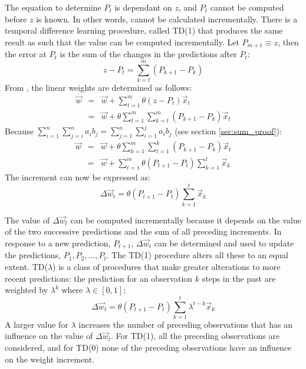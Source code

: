 The equation to determine $P_t$ is dependant on $z$, and $P_t$ cannot be computed before $z$ is known.  In other words,   cannot be calculated incrementally.  There is a temporal difference learning procedure, called TD(1) that produces the same result as   such that the value can be computed incrementally.  Let $P_{m+1}  \equiv z$, then the error at $P_t$ is the sum of the changes in the predictions after $P_t$:
\[
	z - P_t = \sum_{k=t}^{m}(P_{k+1} - P_k)
\]  
From  , the linear weights are determined as follows:
\begin{eqnarray}
\nonumber \vec{w} & = & \vec{w} + \sum_{t=1}^{m}\theta(z - P_t) \vec{x}_t   \\
\nonumber & = & \vec{w} + \theta \sum_{t=1}^{m} \sum_{k=t}^{m}(P_{k+1} - P_k) \vec{x}_t 
\end{eqnarray}
Because $\sum_{i=1}^n\sum_{j=i}^n a_ib_j = \sum_{j=1}^n\sum_{i=1}^j a_ib_j$ (see section \ref{sec:sum_proof}):
\begin{eqnarray}
\nonumber \vec{w} & = & \vec{w} +  \theta \sum_{k=1}^{m}\sum_{t=1}^{k}(P_{k+1} - P_k) \vec{x}_t \\
\nonumber & = & \vec{w} + \sum_{t=1}^{m}\theta(P_{t+1} - P_t) \sum_{k=1}^{t} \vec{x}_k 
\end{eqnarray}
The increment can now be expressed as: 
\begin{equation}
\label{td_delta}
\Delta \vec{w}_t = \theta(P_{t+1} - P_t) \sum_{k=1}^{t} \vec{x}_k
\end{equation}

The value of $\Delta \vec{w}_t$ can be computed incrementally  because it depends on the value of the two successive predictions and the sum of all preceding increments.   In response to a new prediction, $P_{t+1}$, $\Delta \vec{w}_t$ can be determined and used to update the predictions, $P_1, P_2, \ldots,P_t$.  The TD(1) procedure alters all these to an equal extent.  TD($\lambda$) is a class of procedures that make greater alterations to more recent predictions: the prediction for an observation $k$ steps in the past are weighted by $\lambda^k$ where $\lambda \in [0,1]$:
\begin{equation}
\label{eq:dwt}
\Delta \vec{w}_t = \theta(P_{t+1} - P_t) \sum_{k=1}^{t} \lambda^{t-k} \vec{x}_k
\end{equation}
A larger value for $\lambda$ increases the number of preceding observations that has an influence on the value of $\Delta \vec{w}_t$.  For TD(1), all the preceding observations are considered, and for TD(0) none of the preceding observations have an influence on the weight increment. 

